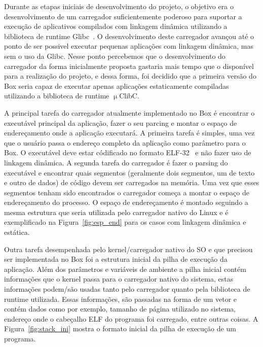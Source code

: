 \documentclass[11pt,twoside]{article}
\begin{document}
Durante as etapas iniciais de desenvolvimento do projeto, o objetivo era
o desenvolvimento de um carregador suficientemente poderoso para suportar
a execução de aplicativos compilados com linkagem dinâmica utilizando a
biblioteca de runtime Glibc~\cite{glibc}. O desenvolvimento deste carregador
avançou até o ponto de ser possivel executar pequenas aplicações com linkagem
dinâmica, mas sem o uso da Glibc. Nesse ponto percebemos que o desenvolvimento
do carregador da forma inicialmente proposta gastaria mais tempo que o 
disponível para a realização do projeto, e dessa forma, foi decidido que
a primeira versão do Box seria capaz de executar apenas aplicações 
estaticamente compiladas utilizando a biblioteca de runtime $\upmu$ClibC.

A principal tarefa do carregador atualmente implementado no Box é 
encontrar o executável principal da aplicação, fazer o seu parcing e
montar o espaço de endereçamento onde a aplicação executará. A primeira
tarefa é simples, uma vez que o usuário passa o endereço completo da
aplicação como parâmetro para o Box. O executável deve estar códificado
no formato ELF-32~\cite{SCO1997} e não fazer uso de linkagem dinâmica. A 
segunda tarefa do carregador é fazer o parsing do executável e encontrar
quais segmentos (geralmente dois segmentos, um de texto e outro de dados) 
de código devem ser carregados na memória. Uma vez que esses segmentos 
tenham sido encontrados o carregador começa a montar o espaço de 
endereçamento do processo. O espaço de endereçamento é montado seguindo
a mesma estrutura que seria utilizada pelo carregador nativo do Linux e
é exemplificado na Figura~\ref{fig:esp_end} para os casos com linkagem
dinâmica e estática.

Outra tarefa desempenhada pelo kernel/carregador nativo do SO e que
precisou ser implementada no Box foi a estrutura inicial da pilha de
execução da aplicação. Além dos parâmetros e variáveis de ambiente a
pilha inicial contém informações que o kernel passa para o carregador
nativo do sistema, estas informações podem/são usadas tanto pelo
carregador quanto pela biblioteca de runtime utilizada. Essas informações,
são passadas na forma de um vetor e contém dados como por exemplo, 
tamanho de página utilizado no sistema, endereço onde o cabeçalho ELF do 
programa foi carregado, entre outras coisas. A Figura~\ref{fig:stack_ini}
mostra o formato inicial da pilha de execução de um programa.
\end{document}
